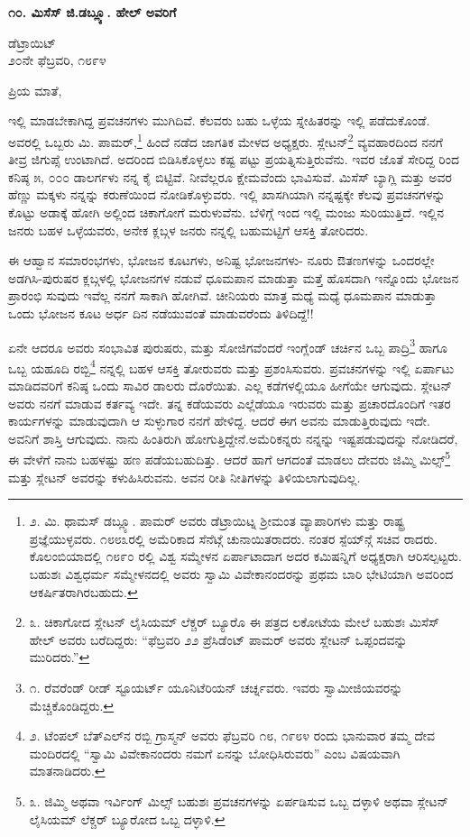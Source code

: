 \begin{center}
\textbf{೧೦. ಮಿಸೆಸ್ ಜಿ.ಡಬ್ಲ್ಯೂ. ಹೇಲ್ ಅವರಿಗೆ}
\end{center}

\begin{flushright}
ಡೆಟ್ರಾಯಿಟ್\\೨೦ನೇ ಫೆಬ್ರವರಿ, ೧೮೯೪
\end{flushright}

ಪ್ರಿಯ ಮಾತೆ,

ಇಲ್ಲಿ ಮಾಡಬೇಕಾಗಿದ್ದ ಪ್ರವಚನಗಳು ಮುಗಿದಿವೆ. ಕೆಲವರು ಬಹು ಒಳ್ಳೆಯ ಸ್ನೇಹಿತರನ್ನು ಇಲ್ಲಿ ಪಡೆದುಕೊಂಡೆ. ಅವರಲ್ಲಿ ಒಬ್ಬರು ಮಿ. ಪಾಮರ್,\footnote{೨. ಮಿ. ಥಾಮಸ್ ಡಬ್ಲ್ಯೂ. ಪಾಮರ್ ಅವರು ಡೆಟ್ರಾಯಿಟ್ನ ಶ‍್ರೀಮಂತ ವ್ಯಾಪಾರಿಗಳು ಮತ್ತು ರಾಷ್ಟ್ರ ಪ್ರಜ್ಞೆಯುಳ್ಳವರು. ೧೮೮೩ರಲ್ಲಿ ಅಮೆರಿಕಾದ ಸೆನೆಟ್ಗೆ ಚುನಾಯಿತರಾದರು. ನಂತರ ಸ್ಪೆಯ್​ನ್ಗೆ ಸಚಿವ ರಾದರು. ಕೊಲಂಬಿಯಾದಲ್ಲಿ ೧೮೯೦ ರಲ್ಲಿ ವಿಶ್ವ ಸಮ್ಮೇಳನ ಏರ್ಪಾಟಾದಾಗ ಅದರ ಕಮಿಷನ್ನಿಗೆ ಅಧ್ಯಕ್ಷರಾಗಿ ಆರಿಸಲ್ಪಟ್ಟರು. ಬಹುಶಃ ವಿಶ್ವಧರ್ಮ ಸಮ್ಮೇಳನದಲ್ಲಿ ಅವರು ಸ್ವಾಮಿ ವಿವೇಕಾನಂದರನ್ನು ಪ್ರಥಮ ಬಾರಿ ಭೇಟಿಯಾಗಿ ಅವರಿಂದ ಆಕರ್ಷಿತರಾಗಿರಬಹುದು.} ಹಿಂದೆ ನಡೆದ ಜಾಗತಿಕ ಮೇಳದ ಅಧ್ಯಕ್ಷರು. ಸ್ಲೇಟನ್\footnote{೩. ಚಿಕಾಗೋದ ಸ್ಲೇಟನ್ ಲೈಸಿಯಮ್​ ಲೆಕ್ಚರ್ ಬ್ಯೂರೊ ಈ ಪತ್ರದ ಲಕೋಟೆಯ ಮೇಲೆ ಬಹುಶಃ ಮಿಸೆಸ್ ಹೇಲ್ ಅವರು ಬರೆದಿದ್ದರು: “ಫೆಬ್ರವರಿ ೨೨ ಪ್ರೆಸಿಡೆಂಟ್ ಪಾಮರ್ ಅವರು ಸ್ಲೇಟನ್ ಒಪ್ಪಂದವನ್ನು ಮುರಿದರು.”} ವ್ಯವಹಾರದಿಂದ ನನಗೆ ತೀವ್ರ ಜಿಗುಪ್ಸೆ ಉಂಟಾಗಿದೆ. ಅದರಿಂದ ಬಿಡಿಸಿಕೊಳ್ಳಲು ಕಷ್ಟ ಪಟ್ಟು ಪ್ರಯತ್ನಿಸುತ್ತಿರುವೆನು. ಇವರ ಜೊತೆ ಸೇರಿದ್ದ ರಿಂದ ಕನಿಷ್ಠ ೫, ೦೦೦ ಡಾಲರ್ಗಳು ನನ್ನ ಕೈ ಬಿಟ್ಟಿವೆ. ನೀವೆಲ್ಲರೂ ಕ್ಷೇಮವೆಂದು ಭಾವಿಸುವೆ. ಮಿಸೆಸ್ ಬ್ಯಾಗ್ಲಿ ಮತ್ತು ಅವರ ಹೆಣ್ಣು ಮಕ್ಕಳು ನನ್ನನ್ನು ಕರುಣೆಯಿಂದ ನೋಡಿಕೊಳ್ಳುವರು. ಇಲ್ಲಿ ಖಾಸಗಿಯಾಗಿ ನನ್ನಷ್ಟಕ್ಕೇ ಕೆಲವು ಪ್ರವಚನಗಳನ್ನು ಕೊಟ್ಟು ಅಡಾಕ್ಕೆ ಹೋಗಿ ಅಲ್ಲಿಂದ ಚಿಕಾಗೋಗೆ ಮರುಳುವೆನು. ಬೆಳಿಗ್ಗೆ ಇಂದ ಇಲ್ಲಿ ಮಂಜು ಸುರಿಯುತ್ತಿದೆ. ಇಲ್ಲಿನ ಜನರು ಬಹಳ ಒಳ್ಳೆಯವರು, ಅನೇಕ ಕ್ಲಬ್ಗಳ ಜನರು ನನ್ನಲ್ಲಿ ಬಹುಮಟ್ಟಿಗೆ ಆಸಕ್ತಿ ತೋರಿದರು.

ಈ ಆಹ್ವಾನ ಸಮಾರಂಭಗಳು, ಭೋಜನ ಕೂಟಗಳು, ಅನಿಷ್ಟ ಭೋಜನಗಳು- ನೂರು ಔತಣಗಳನ್ನು ಒಂದರಲ್ಲೇ ಅಡಗಿಸಿ-ಪುರುಷರ ಕ್ಲಬ್ಗಳಲ್ಲಿ ಭೋಜನಗಳ ನಡುವೆ ಧೂಮಪಾನ ಮಾಡುತ್ತಾ ಮತ್ತೆ ಹೊಸದಾಗಿ ಇನ್ನೊಂದು ಭೋಜನ ಪ್ರಾರಂಭಿ ಸುವುದು ಇವೆಲ್ಲ ನನಗೆ ಸಾಕಾಗಿ ಹೋಗಿವೆ. ಚೀನಿಯರು ಮಾತ್ರ ಮಧ್ಯೆ ಮಧ್ಯೆ ಧೂಮಪಾನ ಮಾಡುತ್ತಾ ಒಂದು ಭೋಜನ ಕೂಟ ಅರ್ಧ ದಿನ ನಡೆಯುವಂತೆ ಮಾಡುವರೆಂದು ತಿಳಿದಿದ್ದೆ!!

ಏನೇ ಆದರೂ ಅವರು ಸಂಭಾವಿತ ಪುರುಷರು, ಮತ್ತು ಸೋಜಿಗವೆಂದರೆ ಇಂಗ್ಲೆಂಡ್ ಚರ್ಚಿನ ಒಬ್ಬ ಪಾದ್ರಿ\footnote{೧. ರೆವರೆಂಡ್ ರೀಡ್ ಸ್ಟೂಯರ್ಟ್ ಯೂನಿಟೆರಿಯನ್ ಚರ್ಚ್ನವರು. ಇವರು ಸ್ವಾಮೀಜಿಯವರನ್ನು ಮೆಚ್ಚಿಕೊಂಡಿದ್ದರು.} ಹಾಗೂ ಒಬ್ಬ ಯಹೂದಿ ರಬ್ಬಿ\footnote{೨. ಟೆಂಪಲ್ ಬೆತ್ಎಲ್​ನ ರಬ್ಬಿ ಗ್ರಾಸ್ಮನ್ ಅವರು ಫೆಬ್ರವರಿ ೧೮, ೧೯೮೪ ರಂದು ಭಾನುವಾರ ತಮ್ಮ ದೇವ ಮಂದಿರದಲ್ಲಿ “ಸ್ವಾಮಿ ವಿವೇಕಾನಂದರು ನಮಗೆ ಏನನ್ನು ಬೋಧಿಸಿರುವರು” ಎಂಬ ವಿಷಯವಾಗಿ ಮಾತನಾಡಿದರು.} ನನ್ನಲ್ಲಿ ಬಹಳ ಆಸಕ್ತಿ ತೋರುವರು ಮತ್ತು ಪ್ರಶಂಸಿಸುವರು. ಪ್ರವಚನಗಳನ್ನು ಇಲ್ಲಿ ಏರ್ಪಾಟು ಮಾಡಿದವರಿಗೆ ಕನಿಷ್ಠ ಒಂದು ಸಾವಿರ ಡಾಲರು ದೊರೆಯಿತು. ಎಲ್ಲ ಕಡೆಗಳಲ್ಲಿಯೂ ಹೀಗೆಯೇ ಆಗುವುದು. ಸ್ಲೇಟನ್ ಅವರು ನನಗೆ ಮಾಡುವ ಕರ್ತವ್ಯ ಇದೇ. ತನ್ನ ಕಡೆಯವರು ಎಲ್ಲೆಡೆಯೂ ಇರುವರು ಮತ್ತು ಪ್ರಚಾರದೊಂದಿಗೆ ಇತರ ಕಾರ್ಯಗಳನ್ನು ಮಾಡುವುದಾಗಿ ಆ ಸುಳ್ಳುಗಾರ ನನಗೆ ಹೇಳಿದ್ದ. ಆದರೆ ಈಗ ಅವನು ಮಾಡುತ್ತಿರುವುದು ಇದೇ. ಅವನಿಗೆ ಶಾಸ್ತಿ ಆಗುವುದು. ನಾನು ಹಿಂತಿರುಗಿ ಹೋಗುತ್ತಿದ್ದೇನೆ.ಅಮೆರಿಕನ್ನರು ನನ್ನನ್ನು ಇಷ್ಟಪಡುವುದನ್ನು ನೋಡಿದರೆ, ಈ ವೇಳೆಗೆ ನಾನು ಬಹಳಷ್ಟು ಹಣ ಪಡೆಯಬಹುದಿತ್ತು. ಆದರೆ ಹಾಗೆ ಆಗದಂತೆ ಮಾಡಲು ದೇವರು ಜಿಮ್ಮಿ ಮಿಲ್ಸ್\footnote{೩. ಜಿಮ್ಮಿ ಅಥವಾ ಇರ್ವಿಂಗ್ ಮಿಲ್ಸ್ ಬಹುಶಃ ಪ್ರವಚನಗಳನ್ನು ಏರ್ಪಡಿಸುವ ಒಬ್ಬ ದಳ್ಳಾಳಿ ಅಥವಾ ಸ್ಲೇಟನ್ ಲೈಸಿಯಮ್​ ಲೆಕ್ಚರ್ ಬ್ಯೂರೋದ ಒಬ್ಬ ದಳ್ಳಾಳಿ.} ಮತ್ತು ಸ್ಲೇಟನ್ ಅವರನ್ನು ಕಳುಹಿಸಿರುವನು. ಅವನ ರೀತಿ ನೀತಿಗಳನ್ನು ತಿಳಿಯಲಾಗುವುದಿಲ್ಲ.

